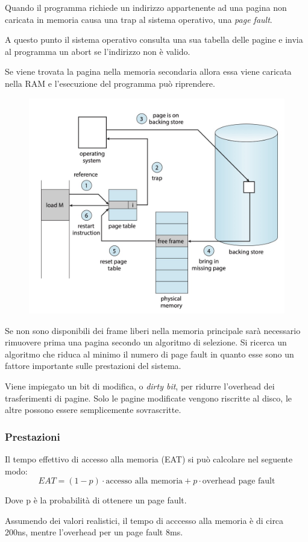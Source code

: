Quando il programma richiede un indirizzo appartenente ad una pagina non caricata in memoria causa una trap al sistema operativo, una \textit{page fault}.

A questo punto il sistema operativo consulta una sua tabella delle pagine e invia al programma un abort se l'indirizzo non è valido.

Se viene trovata la pagina nella memoria secondaria allora essa viene caricata nella RAM e l'esecuzione del programma può riprendere.

\begin{figure}[H]
    \centering
    \includegraphics[width=0.5\linewidth]{assets/gestione-page-fault.jpg}
\end{figure}

Se non sono disponibili dei frame liberi nella memoria principale sarà necessario rimuovere prima una pagina secondo un algoritmo di selezione.
Si ricerca un algoritmo che riduca al minimo il numero di page fault in quanto esse sono un fattore importante sulle prestazioni del sistema.

\spacer
Viene impiegato un bit di modifica, o \textit{dirty bit}, per ridurre l'overhead dei trasferimenti di pagine. Solo le pagine modificate vengono riscritte al disco, le altre possono essere semplicemente sovrascritte.

\subsubsection{Prestazioni}
Il tempo effettivo di accesso alla memoria (EAT) si può calcolare nel seguente modo:
$$EAT = (1 - p)\cdot \text{accesso alla memoria} + p \cdot \text{overhead page fault}$$

Dove p è la probabilità di ottenere un page fault.

\spacer
Assumendo dei valori realistici, il tempo di acccesso alla memoria è di circa 200ns, mentre l'overhead per un page fault 8ms.

